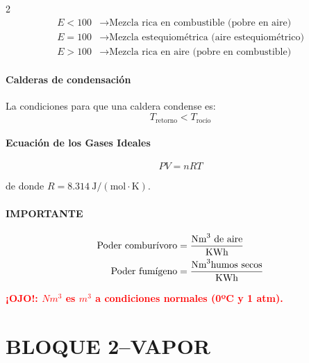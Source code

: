 \documentclass[11pt]{article}
\begin{document}
\begin{multicols*}{2}
    \begin{align*}
        E < 100 &\rightarrow \text{Mezcla rica en combustible (pobre en aire)} \\
        E = 100 &\rightarrow \text{Mezcla estequiométrica (aire estequiométrico)} \\
        E > 100 &\rightarrow \text{Mezcla rica en aire (pobre en combustible)}
    \end{align*}

    \paragraph*{Calderas de condensación}

    La condiciones para que una caldera condense es: 
    \[
        T_{\text{retorno}} < T_{\text{rocío}}
    \]

    \paragraph*{Ecuación de los Gases Ideales}
    \begin{equation}
        PV = nRT
    \end{equation}

    de donde $R = 8.314 \ \mathrm{J/(mol \cdot K)}$.

    \paragraph*{IMPORTANTE}

    \begin{align}
        \text{Poder comburívoro} &= \frac{\text{Nm}^{3} \text{ de aire}}{\text{KWh}} \vphantom{\frac{\text{Nm}^{3} \text{humos secos}}{\text{KWh}}} \\
        \text{Poder fumígeno} &= \frac{\text{Nm}^{3} \text{humos secos}}{\text{KWh}}
    \end{align}

    \textcolor{red}{\textbf{¡OJO!: $Nm^3$ es $m^3$ a condiciones normales (0ºC y 1 atm).}} 
    

\end{multicols*}


\section*{BLOQUE 2--VAPOR}
\end{document}
